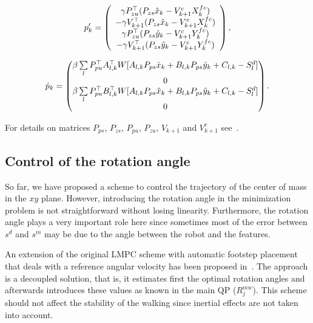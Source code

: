 \begin{equation*}
 p'_k = 
 \left(
 \begin{array}{c}
 \gamma P^{\top}_{zu}(P_{zs} \hat{x}_k - V_{k+1}^c X_k^{fc}) \\
 -\gamma V^{\top}_{k+1}(P_{zs}\hat{x}_k - V_{k+1}^c X_k^{fc}) \\
 \gamma P^{\top}_{zu}(P_{zs} \hat{y}_k - V_{k+1}^c Y_k^{fc}) \\
 -\gamma V^{\top}_{k+1}(P_{zs}\hat{y}_k - V_{k+1}^c Y_k^{fc})
 \end{array}
 \right),
\end{equation*}

\begin{equation*}
 \hat{p}_k = 
 \left(
 \begin{matrix}
 \beta  \sum\limits_l P_{pu}^{\top} A_{l,k}^{\top} W [A_{l,k} P_{ps} \hat{x}_k + B_{l,k} P_{ps} \hat{y}_k + C_{l,k} - S^d_l]\\
 0 \\
 \beta  \sum\limits_l P_{pu}^{\top} B_{l,k}^{\top} W [A_{l,k} P_{ps} \hat{x}_k + B_{l,k} P_{ps} \hat{y}_k + C_{l,k} - S^d_l ]\\
 0
 \end{matrix}
 \right).
\end{equation*}

For details on matrices $P_{ps}$, $P_{zs}$, $P_{pu}$, $P_{zu}$, $V_{k+1}$ and $V_{k+1}^c$ see~\cite{HerdtAR2010}.

\subsection{Control of the rotation angle}
\label{subsection:control_of_the_rotation_angle}
So far, we have proposed a scheme to control the trajectory of the center of mass in the $xy$ plane. However, introducing the rotation angle in the minimization problem is not straightforward without losing linearity. Furthermore, the rotation angle plays a very important role here since sometimes most of the error between $s^d$ and $s^m$ may be due to the angle between the robot and the features.

An extension of the original LMPC scheme with automatic footstep placement that deals with a reference angular velocity has been proposed in~\cite{HerdtIROS2010}. The approach is a decoupled solution, that is, it estimates first the optimal rotation angles and afterwards introduces these values as known in the main QP ($R^{mw}_j$).  This scheme should not affect the stability of the walking since inertial effects are not taken into account.


